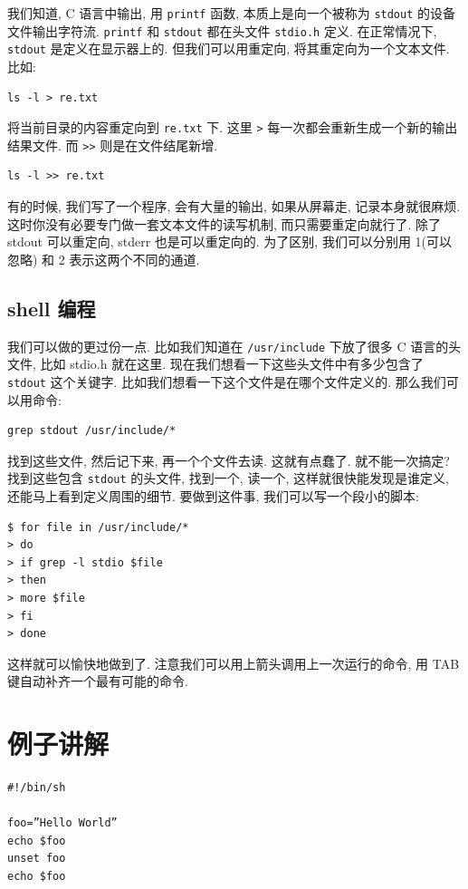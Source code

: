 \documentclass[a4paper]{ctexart}
\begin{document}
我们知道, C 语言中输出, 用 \verb|printf| 函数, 本质上是向一个被称为 \verb|stdout|
的设备文件输出字符流. \verb|printf| 和 \verb|stdout| 都在头文件 \verb|stdio.h| 
定义. 在正常情况下, \verb|stdout| 是定义在显示器上的. 但我们可以用重定向, 将其重定向为一个文本文件.
比如:
\begin{verbatim}
ls -l > re.txt
\end{verbatim}
将当前目录的内容重定向到 \verb|re.txt| 下. 这里 \verb|>| 每一次都会重新生成一个新的输出结果文件.
而 \verb|>>| 则是在文件结尾新增.
\begin{verbatim}
ls -l >> re.txt
\end{verbatim}

有的时候, 我们写了一个程序, 会有大量的输出, 如果从屏幕走, 记录本身就很麻烦.
这时你没有必要专门做一套文本文件的读写机制, 而只需要重定向就行了. 除了 stdout 可以重定向,
stderr 也是可以重定向的. 为了区别, 我们可以分别用 1(可以忽略) 和 2 表示这两个不同的通道. 

\subsection{shell 编程}

我们可以做的更过份一点. 比如我们知道在 \verb|/usr/include| 下放了很多 C 语言的头文件,
比如 stdio.h 就在这里. 现在我们想看一下这些头文件中有多少包含了 \verb|stdout| 这个关键字.
比如我们想看一下这个文件是在哪个文件定义的. 那么我们可以用命令:

\begin{verbatim}
grep stdout /usr/include/*
\end{verbatim}

找到这些文件, 然后记下来, 再一个个文件去读. 这就有点蠢了. 就不能一次搞定? 找到这些包含
\verb|stdout| 的头文件, 找到一个, 读一个, 这样就很快能发现是谁定义, 还能马上看到定义周围的细节.
要做到这件事, 我们可以写一个段小的脚本:

\begin{verbatim}
$ for file in /usr/include/*
> do
> if grep -l stdio $file
> then
> more $file
> fi
> done
\end{verbatim}

这样就可以愉快地做到了. 注意我们可以用上箭头调用上一次运行的命令, 
用 TAB 键自动补齐一个最有可能的命令.


\section{例子讲解}

\begin{verbatim}
#!/bin/sh

foo=”Hello World”
echo $foo
unset foo
echo $foo
\end{verbatim}
\end{document}
